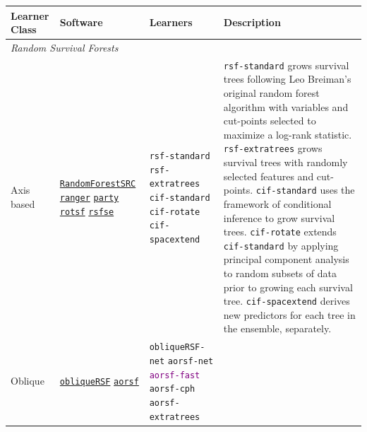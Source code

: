 \documentclass[twoside,11pt]{article}\usepackage[]{graphicx}\usepackage[]{xcolor}
\begin{document}
\begin{landscape}

\begin{table}[h!]
\centering
\begin{tabular}{p{2cm} | p{3cm} p{4cm} p{12cm}}
 \hline
 Learner Class & Software & Learners & Description \\ [0.5ex]
 \hline\hline
 \multicolumn{3}{l}{\textit{Random Survival Forests}}\\
 \hline\hline

 Axis based &

 \href{https://www.randomforestsrc.org/index.html}{\texttt{RandomForestSRC}} \newline
 \href{https://CRAN.R-project.org/package=ranger}{\texttt{ranger}} \newline
 \href{http://party.r-forge.r-project.org/}{\texttt{party}} \newline
 \href{https://github.com/whcsu/rotsf}{\texttt{rotsf}} \newline
 \href{https://github.com/whcsu/rsfse}{\texttt{rsfse}} &

 \texttt{rsf-standard} \newline
 \texttt{rsf-extratrees} \newline
 \texttt{cif-standard} \newline
 \texttt{cif-rotate} \newline
 \texttt{cif-spacextend} &

 \texttt{rsf-standard} grows survival trees following Leo Breiman's original random forest algorithm with variables and cut-points selected to maximize a log-rank statistic. \texttt{rsf-extratrees} grows survival trees with randomly selected features and cut-points. \texttt{cif-standard} uses the framework of conditional inference to grow survival trees. \texttt{cif-rotate} extends \texttt{cif-standard} by applying principal component analysis to random subsets of data prior to growing each survival tree. \texttt{cif-spacextend} derives new predictors for each tree in the ensemble, separately. \\ \hline


 Oblique &


 \href{https://CRAN.R-project.org/package=obliqueRSF}{\texttt{obliqueRSF}} \newline
 \href{https://bcjaeger.github.io/aorsf/}{\texttt{aorsf}} &

 \texttt{obliqueRSF-net} \newline
 \texttt{aorsf-net} \newline
 \textcolor{purple}{\texttt{aorsf-fast}} \newline
 \texttt{aorsf-cph} \newline
 \texttt{aorsf-extratrees} &



\end{tabular}
\end{table}
\end{landscape}
\end{document}
